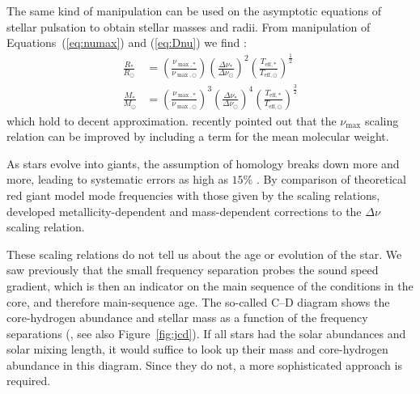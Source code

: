 The same kind of manipulation can be used on the asymptotic equations of stellar pulsation to obtain stellar masses and radii. 
From manipulation of Equations~(\ref{eq:numax}) and (\ref{eq:Dnu}) we find \citep[e.g.,][]{1995A&A...293...87K}:
\begin{align}
    \frac{R_\ast}{R_\odot}
    &=
    \left(
        \frac{\nu_{\max,\ast}}{\nu_{\max,\odot}}
    \right)
    \left(
        \frac{\Delta\nu_\ast}{\Delta\nu_\odot}
    \right)^2
    \left(
        \frac{T_{\text{eff},\ast}}{T_{\text{eff},\odot}}
    \right)^\frac{1}{2}
    \\
    \frac{M_\ast}{M_\odot}
    &=
    \left(
        \frac{\nu_{\max,\ast}}{\nu_{\max,\odot}}
    \right)^3
    \left(
        \frac{\Delta\nu_\ast}{\Delta\nu_\odot}
    \right)^4
    \left(
        \frac{T_{\text{eff},\ast}}{T_{\text{eff},\odot}}
    \right)^\frac{3}{2}
\end{align}
which hold to decent approximation. 
\citet{2017ApJ...843...11V} recently pointed out that the $\nu_{\max}$ scaling relation can be improved by including a term for the mean molecular weight. 

As stars evolve into giants, the assumption of homology breaks down more and more, leading to systematic errors as high as $15\%$ \citep[e.g.,][]{2016ApJ...832..121G}. 
By comparison of theoretical red giant model mode frequencies with those given by the scaling relations, \citet{2016MNRAS.460.4277G, 2017MNRAS.470.2069G} developed metallicity-dependent and mass-dependent corrections to the $\Delta\nu$ scaling relation. 

These scaling relations do not tell us about the age or evolution of the star. 
We saw previously that the small frequency separation probes the sound speed gradient, which is then an indicator on the main sequence of the conditions in the core, and therefore main-sequence age. 
The so-called C--D diagram shows the core-hydrogen abundance and stellar mass as a function of the frequency separations (\citealt{1984srps.conf...11C}, see also Figure~\ref{fig:jcd}). 
If all stars had the solar abundances and solar mixing length, it would suffice to look up their mass and core-hydrogen abundance in this diagram. 
Since they do not, a more sophisticated approach is required. 

